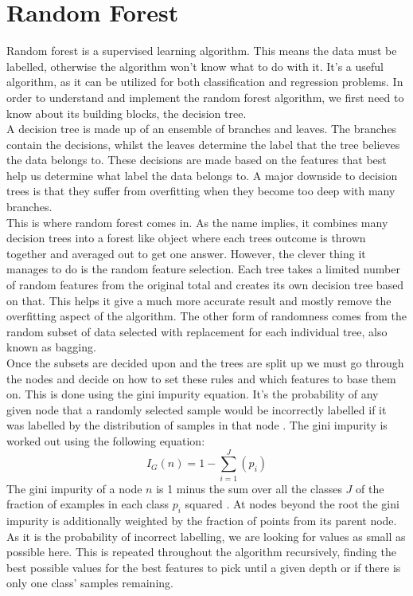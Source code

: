 \section{Random Forest}
Random forest is a supervised learning algorithm. This means the data must be labelled, otherwise the algorithm won't know what to do with it. It's a useful algorithm, as it can be utilized for both classification and regression problems. In order to understand and implement the random forest algorithm, we first need to know about its building blocks, the decision tree.\\ 
A decision tree is made up of an ensemble of branches and leaves. The branches contain the decisions, whilst the leaves determine the label that the tree believes the data belongs to. These decisions are made based on the features that best help us determine what label the data belongs to. A major downside to decision trees is that they suffer from overfitting when they become too deep with many branches.\\ 
This is where random forest comes in. As the name implies, it combines many decision trees into a forest like object where each trees outcome is thrown together and averaged out to get one answer. However, the clever thing it manages to do is the random feature selection. Each tree takes a limited number of random features from the original total and creates its own decision tree based on that. This helps it give a much more accurate result and mostly remove the overfitting aspect of the algorithm. The other form of randomness comes from the random subset of data selected with replacement for each individual tree, also known as bagging.\\
Once the subsets are decided upon and the trees are split up we must go through the nodes and decide on how to set these rules and which features to base them on. This is done using the gini impurity equation. It's the probability of any given node that a randomly selected sample would be incorrectly labelled if it was labelled by the distribution of samples in that node \cite{DataScience001}.
The gini impurity is worked out using the following equation:
\begingroup
\fontsize{20pt}{10pt}
$$ I_{G}(n) = 1 - \sum_{i=1}^{J}(p_{i}) $$
\endgroup
The gini impurity of a node $n$ is 1 minus the sum over all the classes $J$ of the fraction of examples in each class $p_{i}$ squared \cite{DataScience001}. At nodes beyond the root the gini impurity is additionally weighted by the fraction of points from its parent node. As it is the probability of incorrect labelling, we are looking for values as small as possible here. This is repeated throughout the algorithm recursively, finding the best possible values for the best features to pick until a given depth or if there is only one class' samples remaining. 
